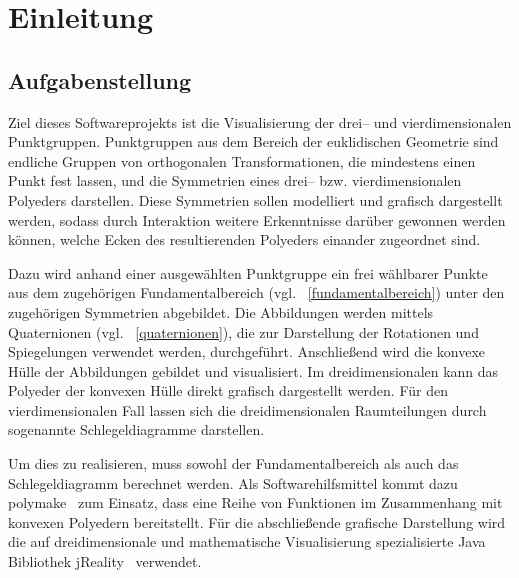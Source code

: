 \section{Einleitung}

\subsection{Aufgabenstellung}

    Ziel dieses Softwareprojekts ist die Visualisierung der drei-- und vierdimensionalen Punktgruppen. Punktgruppen aus dem Bereich der euklidischen Geometrie sind endliche Gruppen von orthogonalen Transformationen, die mindestens einen Punkt fest lassen, und die Symmetrien eines drei-- bzw. vierdimensionalen Polyeders darstellen. Diese Symmetrien sollen modelliert und grafisch dargestellt werden, sodass durch Interaktion weitere Erkenntnisse darüber gewonnen werden können, welche Ecken des resultierenden Polyeders einander zugeordnet sind.
    
    Dazu wird anhand einer ausgewählten Punktgruppe ein frei wählbarer Punkte aus dem zugehörigen Fundamentalbereich (vgl. ~\ref{fundamentalbereich}) unter den zugehörigen Symmetrien abgebildet. Die Abbildungen werden mittels Quaternionen (vgl. ~\ref{quaternionen}), die zur Darstellung der Rotationen und Spiegelungen verwendet werden, durchgeführt. Anschließend wird die konvexe Hülle der Abbildungen gebildet und visualisiert. Im dreidimensionalen kann das Polyeder der konvexen Hülle direkt grafisch dargestellt werden. Für den vierdimensionalen Fall lassen sich die dreidimensionalen Raumteilungen durch sogenannte Schlegeldiagramme darstellen.
    
    Um dies zu realisieren, muss sowohl der Fundamentalbereich als auch das Schlegeldiagramm berechnet werden. Als Softwarehilfsmittel kommt dazu polymake~\cite{polymake} zum Einsatz, dass eine Reihe von Funktionen im Zusammenhang mit konvexen Polyedern bereitstellt. Für die abschließende grafische Darstellung wird die auf dreidimensionale und mathematische Visualisierung spezialisierte Java Bibliothek jReality~\cite{jreality} verwendet.

